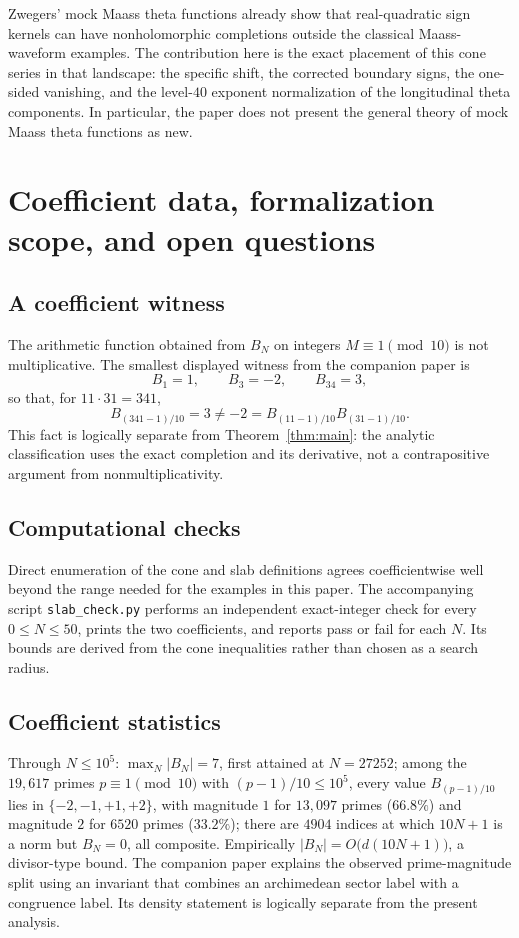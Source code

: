 \documentclass[12pt]{amsart}
\theoremstyle{definition}
\theoremstyle{remark}
\begin{document}
Zwegers' mock Maass theta functions \cite{jZw12} already show that
real-quadratic sign kernels can have nonholomorphic completions outside
the classical Maass-waveform examples.  The contribution here is the
exact placement of this cone series in that landscape: the
specific shift, the corrected boundary signs, the one-sided vanishing,
and the level-$40$ exponent normalization of the longitudinal theta
components.  In particular, the paper does not present
the general theory of mock Maass theta functions as new.

\section{Coefficient data, formalization scope, and open questions}
\label{sec:status}

\subsection{A coefficient witness}
The arithmetic function obtained from $B_N$ on integers
$M\equiv1\pmod{10}$ is not multiplicative.  The smallest displayed
witness from the companion paper is
\[
  B_1=1,\qquad B_3=-2,\qquad B_{34}=3,
\]
so that, for $11\cdot31=341$,
\[
  B_{(341-1)/10}=3\neq-2
  =B_{(11-1)/10}B_{(31-1)/10}.
\]
This fact is logically separate from Theorem~\ref{thm:main}: the
analytic classification uses the exact completion and its derivative,
not a contrapositive argument from nonmultiplicativity.

\subsection{Computational checks}
Direct enumeration of the cone and slab definitions agrees
coefficientwise well beyond the range needed for the examples in this
paper.  The accompanying script \texttt{slab\_check.py} performs an
independent exact-integer check for every $0\leq N\leq50$, prints the
two coefficients, and reports pass or fail for each $N$.  Its bounds
are derived from the cone inequalities rather than chosen as a search
radius.

\subsection{Coefficient statistics}
Through $N\leq10^5$: $\max_N|B_N|=7$, first attained at $N=27252$;
among the $19{,}617$ primes $p\equiv1\pmod{10}$ with
$(p-1)/10\leq10^5$, every value $B_{(p-1)/10}$ lies in
$\{-2,-1,+1,+2\}$, with magnitude $1$ for $13{,}097$ primes
($66.8\%$) and magnitude $2$ for $6520$ primes ($33.2\%$); there are
$4904$ indices at which
$10N+1$ is a norm but $B_N=0$, all composite.  Empirically
$|B_N|=O\bigl(d(10N+1)\bigr)$, a divisor-type bound.  The companion
paper explains the observed prime-magnitude split using an invariant
that combines an archimedean sector label with a congruence label.  Its
density statement is logically separate from the present analysis.
\end{document}
